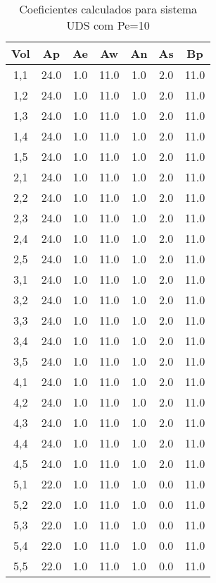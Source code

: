 \documentclass[]{article}
\begin{document}
\begin{table}[H]
	\centering
	\begin{tabular}{|c|c|c|c|c|c|c|}
		\hline
		\textbf{Vol} & \textbf{Ap} & \textbf{Ae} & \textbf{Aw} & \textbf{An} & \textbf{As} & \textbf{Bp} \\
		\hline
		1,1  & 24.0  & 1.0  & 11.0  & 1.0  & 2.0  & 11.0 \\
		1,2  & 24.0  & 1.0  & 11.0  & 1.0  & 2.0  & 11.0 \\
		1,3  & 24.0  & 1.0  & 11.0  & 1.0  & 2.0  & 11.0 \\
		1,4  & 24.0  & 1.0  & 11.0  & 1.0  & 2.0  & 11.0 \\
		1,5  & 24.0  & 1.0  & 11.0  & 1.0  & 2.0  & 11.0 \\
		2,1  & 24.0  & 1.0  & 11.0  & 1.0  & 2.0  & 11.0 \\
		2,2  & 24.0  & 1.0  & 11.0  & 1.0  & 2.0  & 11.0 \\
		2,3  & 24.0  & 1.0  & 11.0  & 1.0  & 2.0  & 11.0 \\
		2,4  & 24.0  & 1.0  & 11.0  & 1.0  & 2.0  & 11.0 \\
		2,5  & 24.0  & 1.0  & 11.0  & 1.0  & 2.0  & 11.0 \\
		3,1  & 24.0  & 1.0  & 11.0  & 1.0  & 2.0  & 11.0 \\
		3,2  & 24.0  & 1.0  & 11.0  & 1.0  & 2.0  & 11.0 \\
		3,3  & 24.0  & 1.0  & 11.0  & 1.0  & 2.0  & 11.0 \\
		3,4  & 24.0  & 1.0  & 11.0  & 1.0  & 2.0  & 11.0 \\
		3,5  & 24.0  & 1.0  & 11.0  & 1.0  & 2.0  & 11.0 \\
		4,1  & 24.0  & 1.0  & 11.0  & 1.0  & 2.0  & 11.0 \\
		4,2  & 24.0  & 1.0  & 11.0  & 1.0  & 2.0  & 11.0 \\
		4,3  & 24.0  & 1.0  & 11.0  & 1.0  & 2.0  & 11.0 \\
		4,4  & 24.0  & 1.0  & 11.0  & 1.0  & 2.0  & 11.0 \\
		4,5  & 24.0  & 1.0  & 11.0  & 1.0  & 2.0  & 11.0 \\
		5,1  & 22.0  & 1.0  & 11.0  & 1.0  & 0.0  & 11.0 \\
		5,2  & 22.0  & 1.0  & 11.0  & 1.0  & 0.0  & 11.0 \\
		5,3  & 22.0  & 1.0  & 11.0  & 1.0  & 0.0  & 11.0 \\
		5,4  & 22.0  & 1.0  & 11.0  & 1.0  & 0.0  & 11.0 \\
		5,5  & 22.0  & 1.0  & 11.0  & 1.0  & 0.0  & 11.0 \\
		\hline
	\end{tabular}
	\caption{Coeficientes calculados para sistema UDS com Pe=10}
\end{table}
\end{document}

